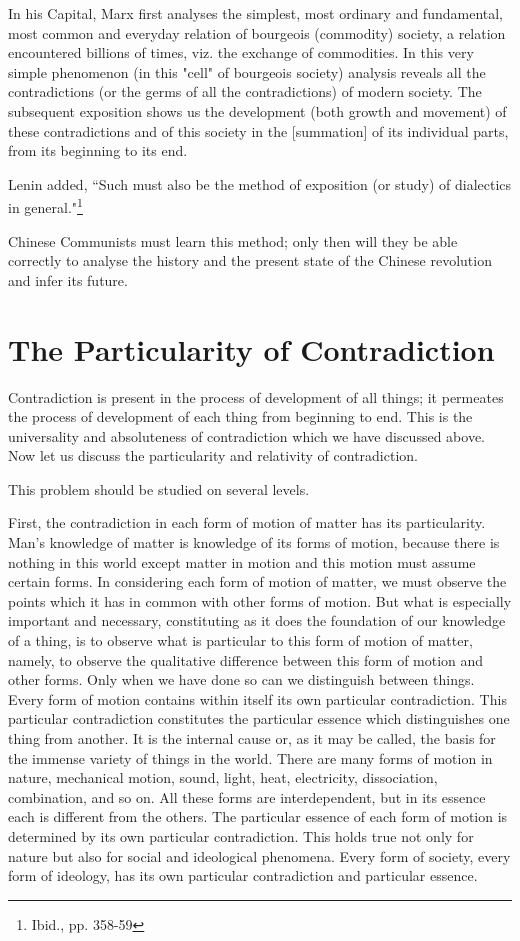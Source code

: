 \documentclass{article}
\begin{document}
In his Capital, Marx first analyses the simplest, most ordinary and
fundamental, most common and everyday relation of bourgeois (commodity)
society, a relation encountered billions of times, viz. the exchange of
commodities. In this very simple phenomenon (in this "cell" of bourgeois
society) analysis reveals all the contradictions (or the germs of all the
contradictions) of modern society. The subsequent exposition shows us the
development (both growth and movement) of these contradictions and of this
society in the [summation] of its individual parts, from its beginning to its
end.

Lenin added, ``Such must also be the method of exposition (or study) of
dialectics in general."\footnote{Ibid., pp. 358-59}

Chinese Communists must learn this method; only then will they be able
correctly to analyse the history and the present state of the Chinese
revolution and infer its future.

\section{The Particularity of Contradiction}

Contradiction is present in the process of development of all things; it
permeates the process of development of each thing from beginning to end. This
is the universality and absoluteness of contradiction which we have discussed
above. Now let us discuss the particularity and relativity of contradiction.

This problem should be studied on several levels.

First, the contradiction in each form of motion of matter has its
particularity. Man's knowledge of matter is knowledge of its forms of motion,
because there is nothing in this world except matter in motion and this motion
must assume certain forms. In considering each form of motion of matter, we
must observe the points which it has in common with other forms of motion. But
what is especially important and necessary, constituting as it does the
foundation of our knowledge of a thing, is to observe what is particular to
this form of motion of matter, namely, to observe the qualitative difference
between this form of motion and other forms. Only when we have done so can we
distinguish between things. Every form of motion contains within itself its own
particular contradiction. This particular contradiction constitutes the
particular essence which distinguishes one thing from another. It is the
internal cause or, as it may be called, the basis for the immense variety of
things in the world. There are many forms of motion in nature, mechanical
motion, sound, light, heat, electricity, dissociation, combination, and so on.
All these forms are interdependent, but in its essence each is different from
the others. The particular essence of each form of motion is determined by its
own particular contradiction. This holds true not only for nature but also for
social and ideological phenomena. Every form of society, every form of
ideology, has its own particular contradiction and particular essence.
\end{document}
